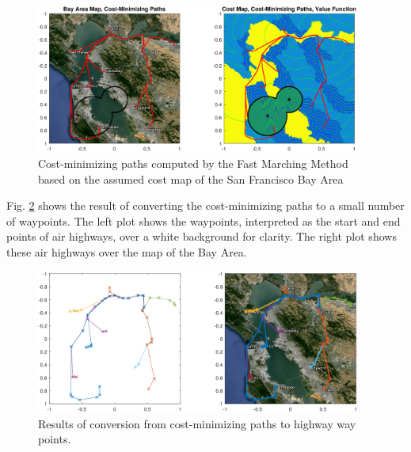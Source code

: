 \begin{figure}
	\centering
	\includegraphics[width=0.95\textwidth]{"fig/airHighway_results"}
	\caption{Cost-minimizing paths computed by the Fast Marching Method based on the assumed cost map of the San Francisco Bay Area}
	\label{fig:airHighway_results}
\end{figure}

Fig. \ref{fig:airHighway_sparse} shows the result of converting the cost-minimizing paths to a small number of waypoints. The left plot shows the waypoints, interpreted as the start and end points of air highways, over a white background for clarity. The right plot shows these air highways over the map of the Bay Area.

\begin{figure}
	\centering
	\includegraphics[width=0.95\textwidth]{"fig/airHighway_sparse"}
	\caption{Results of conversion from cost-minimizing paths to highway way points.}
	\label{fig:airHighway_sparse}
\end{figure}